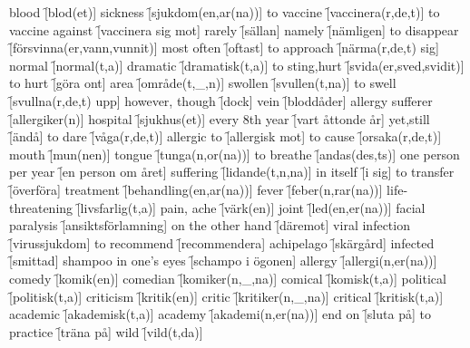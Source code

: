 \begin{questions}
\begin{multicols}{2}
        \question blood \f[blod(et)]
        \question sickness \f[sjukdom(en,ar(na))]
        \question to vaccine \f[vaccinera(r,de,t)]
        \question to vaccine against \f[vaccinera sig mot]
        \question rarely \f[sällan]
        \question namely \f[nämligen]
        \question to disappear \f[försvinna(er,vann,vunnit)]
        \question most often \f[oftast]
        \question to approach \f[närma(r,de,t) sig]
        \question normal \f[normal(t,a)]
        \question dramatic \f[dramatisk(t,a)]
        \question to sting,hurt \f[svida(er,sved,svidit)]
        \question to hurt \f[göra ont]
        \question area \f[område(t,\_,n)]
        \question swollen \f[svullen(t,na)]
        \question to swell \f[svullna(r,de,t) upp]
        \question however, though \f[dock]
        \question vein \f[bloddåder]
        \question allergy sufferer \f[allergiker(n)]
        \question hospital \f[sjukhus(et)]
        \question every 8th year \f[vart åttonde år]
        \question yet,still \f[ändå]
        \question to dare \f[våga(r,de,t)]
        \question allergic to \f[allergisk mot]
        \question to cause \f[orsaka(r,de,t)]
        \question mouth \f[mun(nen)]
        \question tongue \f[tunga(n,or(na))]
        \question to breathe \f[andas(des,ts)]
        \question one person per year \f[en person om året]
        \question suffering \f[lidande(t,n,na)]
        \question in itself \f[i sig]
        \question to transfer \f[överföra]
        \question treatment \f[behandling(en,ar(na))]
        \question fever \f[feber(n,rar(na))]
        \question life-threatening \f[livsfarlig(t,a)]
        \question pain, ache \f[värk(en)]
        \question joint \f[led(en,er(na))]
        \question facial paralysis \f[ansiktsförlamning]
        \question on the other hand \f[däremot]
        \question viral infection \f[virussjukdom]
        \question to recommend \f[recommendera]
        \question achipelago \f[skärgård]
        \question infected \f[smittad]
        \question shampoo in one's eyes \f[schampo i ögonen]
        \question allergy \f[allergi(n,er(na))]
        \question comedy \f[komik(en)]
        \question comedian \f[komiker(n,\_,na)]
        \question comical \f[komisk(t,a)]
        \question political \f[politisk(t,a)]
        \question criticism \f[kritik(en)]
        \question critic \f[kritiker(n,\_,na)]
        \question critical \f[kritisk(t,a)]
        \question academic \f[akademisk(t,a)]
        \question academy \f[akademi(n,er(na))]
        \question end on \f[sluta på]
        \question to practice \f[träna på]
        \question wild \f[vild(t,da)]

\end{multicols}
\end{questions}
